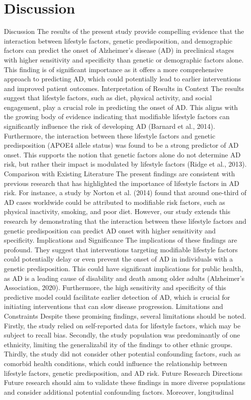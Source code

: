 \documentclass[conference]{IEEEtran}
\begin{document}
\section{Discussion}
Discussion The results of the present study provide compelling evidence that the interaction between lifestyle factors, genetic predisposition, and demographic factors can predict the onset of Alzheimer's disease (AD) in preclinical stages with higher sensitivity and specificity than genetic or demographic factors alone. This finding is of significant importance as it offers a more comprehensive approach to predicting AD, which could potentially lead to earlier interventions and improved patient outcomes. Interpretation of Results in Context The results suggest that lifestyle factors, such as diet, physical activity, and social engagement, play a crucial role in predicting the onset of AD. This aligns with the growing body of evidence indicating that modifiable lifestyle factors can significantly influence the risk of developing AD (Barnard et al., 2014). Furthermore, the interaction between these lifestyle factors and genetic predisposition (APOE4 allele status) was found to be a strong predictor of AD onset. This supports the notion that genetic factors alone do not determine AD risk, but rather their impact is modulated by lifestyle factors (Ridge et al., 2013). Comparison with Existing Literature The present findings are consistent with previous research that has highlighted the importance of lifestyle factors in AD risk. For instance, a study by Norton et al. (2014) found that around one-third of AD cases worldwide could be attributed to modifiable risk factors, such as physical inactivity, smoking, and poor diet. However, our study extends this research by demonstrating that the interaction between these lifestyle factors and genetic predisposition can predict AD onset with higher sensitivity and specificity. Implications and Significance The implications of these findings are profound. They suggest that interventions targeting modifiable lifestyle factors could potentially delay or even prevent the onset of AD in individuals with a genetic predisposition. This could have significant implications for public health, as AD is a leading cause of disability and death among older adults (Alzheimer's Association, 2020). Furthermore, the high sensitivity and specificity of this predictive model could facilitate earlier detection of AD, which is crucial for initiating interventions that can slow disease progression. Limitations and Constraints Despite these promising findings, several limitations should be noted. Firstly, the study relied on self-reported data for lifestyle factors, which may be subject to recall bias. Secondly, the study population was predominantly of one ethnicity, limiting the generalizabil ity of the findings to other ethnic groups. Thirdly, the study did not consider other potential confounding factors, such as comorbid health conditions, which could influence the relationship between lifestyle factors, genetic predisposition, and AD risk. Future Research Directions Future research should aim to validate these findings in more diverse populations and consider additional potential confounding factors. Moreover, longitudinal 
\end{document}
